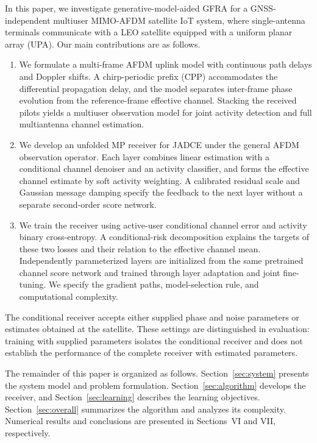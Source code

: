 In this paper, we investigate generative-model-aided GFRA for a
GNSS-independent multiuser MIMO-AFDM satellite IoT system, where
single-antenna terminals communicate with a LEO satellite equipped with
a uniform planar array (UPA). Our main contributions are as follows.
\begin{enumerate}[label=\arabic*)]
\item We formulate a multi-frame AFDM uplink model with continuous path
delays and Doppler shifts. A chirp-periodic prefix (CPP) accommodates
the differential propagation delay, and the model separates
inter-frame phase evolution from the reference-frame effective
channel. Stacking the received pilots yields a multiuser observation
model for joint activity detection and full multiantenna channel
estimation.

\item We develop an unfolded MP receiver for JADCE under the general
AFDM observation operator. Each layer combines linear estimation with
a conditional channel denoiser and an activity classifier, and forms
the effective channel estimate by soft activity weighting. A calibrated
residual scale and Gaussian message damping specify the feedback to
the next layer without a separate second-order score network.

\item We train the receiver using active-user conditional channel
error and activity binary cross-entropy. A conditional-risk
decomposition explains the targets of these two losses and their
relation to the effective channel mean. Independently parameterized
layers are initialized from the same pretrained channel score network
and trained through layer adaptation and joint fine-tuning. We specify
the gradient paths, model-selection rule, and computational complexity.
\end{enumerate}

The conditional receiver accepts either supplied phase and noise
parameters or estimates obtained at the satellite. These settings are
distinguished in evaluation: training with supplied parameters isolates
the conditional receiver and does not establish the performance of the
complete receiver with estimated parameters.

The remainder of this paper is organized as follows.
Section~\ref{sec:system} presents the system model and problem
formulation. Section~\ref{sec:algorithm} develops the receiver, and
Section~\ref{sec:learning} describes the learning objectives.
Section~\ref{sec:overall} summarizes the algorithm and analyzes its
complexity. Numerical results and conclusions are presented in
Sections~VI and VII, respectively.
